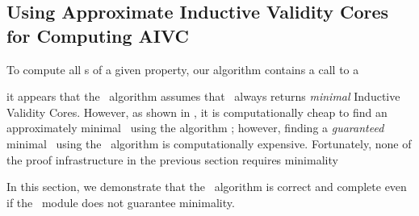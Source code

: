 \subsection{Using Approximate Inductive Validity Cores for Computing AIVC}
\label{subsec:minimality}

To compute all \ivc s of a given property, our algorithm contains a call to a \getivc\ 


it appears that the \aivcalg ~algorithm
assumes that \getivc\ always returns \emph{minimal} Inductive Validity Cores.
However, as shown in \cite{Ghass16}, it is computationally cheap to find an 
approximately minimal \ivc\ using the algorithm \ucalg; however, finding a {\em guaranteed} 
minimal \ivc\ using the \ucbfalg\ algorithm is computationally expensive.  Fortunately,
none of the proof infrastructure in the previous section requires minimality


In this section,
we demonstrate that the \aivcalg ~algorithm is correct and complete even if the \getivc ~module does not guarantee minimality.  %



